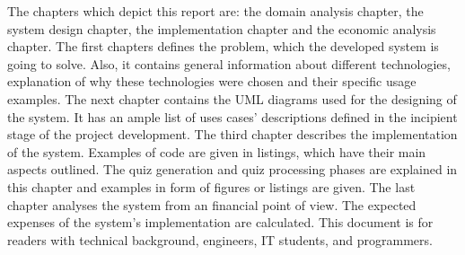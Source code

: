 The chapters which depict this report are: the domain analysis chapter, the system design chapter, the implementation chapter and the economic analysis chapter. The first chapters defines the problem, which the developed system is going to solve. Also, it contains general information about different technologies, explanation of why these technologies were chosen and their specific usage examples. The next chapter contains the UML diagrams used for the designing of the system. It has an ample list of uses cases' descriptions defined in the incipient stage of the project development. The third chapter describes the implementation of the system. Examples of code are given in listings, which have their main aspects outlined. The quiz generation and quiz processing phases are explained in this chapter and examples in form of figures or listings are given. The last chapter analyses the system from an financial point of view. The expected expenses of the system's implementation are calculated. This document is for readers with technical background, engineers, IT students, and programmers. 


